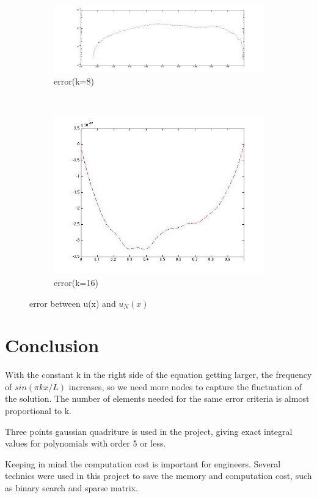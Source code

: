 \documentclass[paper=a4, fontsize=11pt]{article} %
\begin{document}
\begin{figure}
        \begin{subfigure}[b]{0.45\textwidth}
                \includegraphics[width=\textwidth]{errork8.jpg}
                \caption{error(k=8)}
                \label{fig:k8}
        \end{subfigure}
        ~ 
         \begin{subfigure}[b]{0.45\textwidth}
                \includegraphics[width=\textwidth]{errork16.jpg}
                \caption{error(k=16)}
                \label{fig:k8}
        \end{subfigure}

        \caption{error between u(x) and $u_N(x)$}\label{fig:error}
\end{figure}




\section{Conclusion}
With the constant k in the right side of the equation getting larger, the frequency of $sin(\pi k x /L)$ increases, so we need more nodes to capture the fluctuation of the solution. The number of elements needed for the same error criteria is almost proportional to k.

Three points gaussian quadriture is used in the project, giving exact integral values for polynomials with order 5 or less. 

Keeping in mind the computation cost is important for engineers. Several technics were used in this project to save the memory and computation cost, such as binary search and sparse matrix. 
\end{document}
